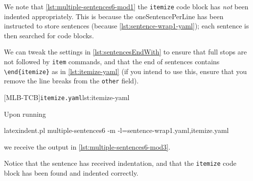 

	We note that \cref{lst:multiple-sentences6-mod1} the \texttt{itemize} code block has
	\emph{not} been indented appropriately. This is because the oneSentencePerLine has been
	instructed to store sentences (because \cref{lst:sentence-wrap1-yaml}); each sentence is
	then searched for code blocks.

	We can tweak the settings in \vref{lst:sentencesEndWith} to ensure that full stops are
	not followed by \texttt{item} commands, and that the end of sentences contains
	\lstinline!\end{itemize}! as in \cref{lst:itemize-yaml} (if you intend to use this,
	ensure that you remove the line breaks from the \texttt{other} field).  
	 

	[MLB-TCB]{\texttt{itemize.yaml}}{lst:itemize-yaml}

	Upon running  
	\begin{commandshell}
latexindent.pl multiple-sentences6 -m -l=sentence-wrap1.yaml,itemize.yaml
\end{commandshell}
	we receive the output in \cref{lst:multiple-sentences6-mod3}.


	Notice that the sentence has received indentation, and that the \texttt{itemize} code
	block has been found and indented correctly.
